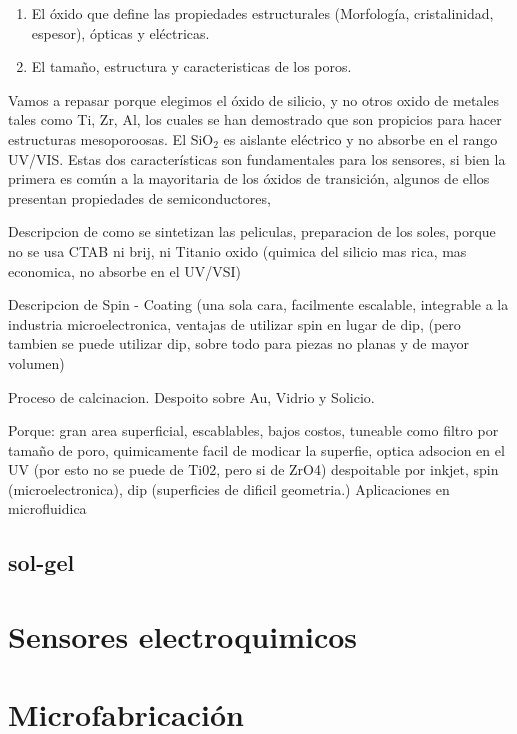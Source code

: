 				\begin{enumerate}
					\item El óxido que define las propiedades estructurales (Morfología, cristalinidad, espesor), ópticas y eléctricas.
					\item El tamaño, estructura y caracteristicas de los poros.
				\end{enumerate}

				Vamos a repasar porque elegimos el óxido de silicio, y no otros oxido de metales tales como Ti, Zr, Al, los cuales se han demostrado que son propicios para hacer estructuras mesoporoosas. El SiO$_2$ es aislante eléctrico y no absorbe en el rango UV/VIS. Estas dos características son fundamentales para los sensores, si bien la primera es común a la mayoritaria de los óxidos de transición, algunos de ellos presentan propiedades de semiconductores, 

				Descripcion de como se sintetizan las peliculas, preparacion de los soles, porque no se usa CTAB ni brij, ni Titanio oxido (quimica del silicio mas rica, mas economica, no absorbe en el UV/VSI)

				Descripcion de Spin - Coating (una sola cara, facilmente escalable, integrable a la industria microelectronica, ventajas de utilizar spin en lugar de dip, (pero tambien se puede utilizar dip, sobre todo para piezas no planas y de mayor volumen)

				Proceso de calcinacion. Despoito sobre Au, Vidrio y Solicio.

				Porque: gran area superficial, escablables, bajos costos, tuneable como filtro por tamaño de poro, quimicamente facil de modicar la superfie, optica adsocion en el UV (por esto no se puede de Ti02, pero si de ZrO4) despoitable por inkjet\cite{Lian2013,Mougenot2006a}, spin (microelectronica), dip (superficies de dificil geometria.)
				Aplicaciones en microfluidica \cite{schmuhl2005,Martinez2009}
				
	\subsection{sol-gel}	

\section{Sensores electroquimicos}

\section{Microfabricación}

